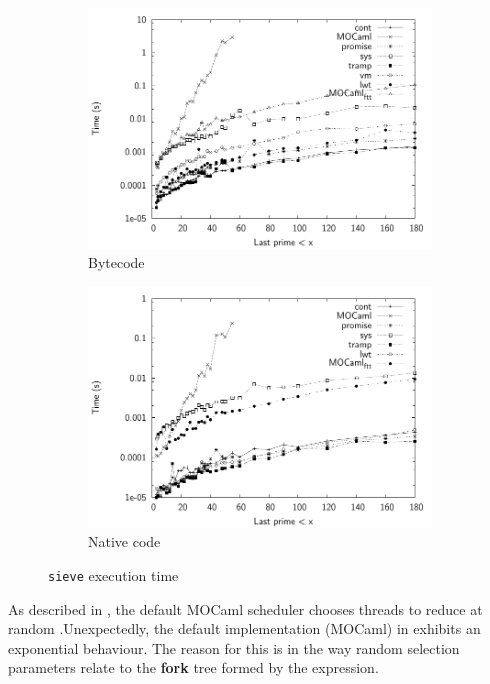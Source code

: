 \documentclass[12pt,twoside,notitlepage]{report}
\theoremstyle{plain}%
\theoremstyle{definition}
\theoremstyle{remark}
\begin{document}
\begin{figure}[H]
\centering
\begin{subfigure}[b]{0.6\linewidth}
\includegraphics[width=\linewidth]{./sieve_exec_times_bw}
\caption{Bytecode}
\label{fig:sieve_exec_times_bc}
\end{subfigure}
\begin{subfigure}[b]{0.6\linewidth}
\includegraphics[width=\linewidth]{./sieve_exec_times_opt_bw}
\caption{Native code}
\label{fig:sieve_exec_times_nat}
\end{subfigure}
\cprotect\caption{\verb|sieve| execution time}
\label{fig:sieve_exec_times}
\end{figure}


As described in , the default MOCaml scheduler chooses threads to reduce at random .Unexpectedly, the default implementation (MOCaml) in  exhibits an exponential behaviour. The reason for this is in the way random selection parameters relate to the \textbf{fork} tree formed by the expression.
\end{document}
